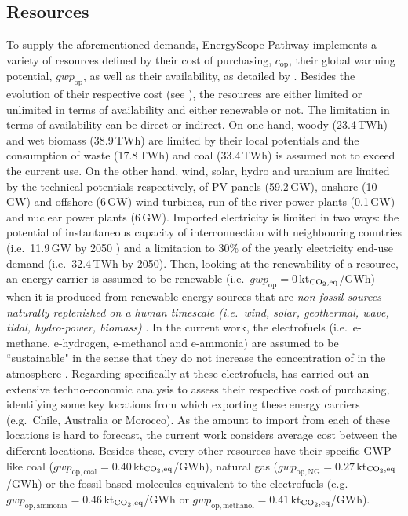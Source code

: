 \documentclass[11pt,twoside,a4paper,english]{article}
\def\eg{e.g.\ }
\def\ie{i.e.\ }
\begin{document}
\subsection{Resources}
\label{subsec:cs:resources}
To supply the aforementioned demands, EnergyScope Pathway implements a variety of resources defined by their cost of purchasing, $\mathit{c}_{\mathrm{op}}$, their global warming potential, $\mathit{gwp}_{\mathrm{op}}$, as well as their 
availability, as detailed by \citet{limpens2023pathway}. Besides the evolution of their respective cost (see ), the resources are either limited or unlimited in terms of availability and either renewable or not. The limitation in terms of availability can be direct or indirect. On one hand, woody (23.4\,TWh) and wet biomass (38.9\,TWh) are limited by their local potentials and the consumption of waste (17.8\,TWh) and coal (33.4\,TWh) is assumed not to exceed the current use. On the other hand, wind, solar, hydro and uranium are limited by the technical potentials respectively, of \gls{PV} panels (59.2\,GW), onshore (10\,GW) and offshore (6\,GW) wind turbines, run-of-the-river power plants (0.1\,GW) and nuclear power plants (6\,GW). Imported electricity is limited in two ways: the potential of instantaneous capacity of interconnection with neighbouring countries (\ie 11.9\,GW by 2050 \cite{ELIA_2050}) and a limitation to 30\% of the yearly electricity end-use demand (\ie 32.4\,TWh by 2050). Then, looking at the renewability of a resource, an energy carrier is assumed to be renewable (\ie $\mathit{gwp}_{\mathrm{op}}=0$\,kt$_{\ce{CO2},\text{eq}}$/GWh) when it is produced from renewable energy sources \cite{eu2003directive} that are \textit{non-fossil sources naturally replenished on a human timescale (\ie wind, solar, geothermal, wave, tidal, hydro-power, biomass)} \cite{ellabban2014}. In the current work, the electrofuels (\ie e-methane, e-hydrogen, e-methanol and e-ammonia) are assumed to be ``sustainable" in the sense that they do not increase the concentration of  in the atmosphere \cite{rixhon2021terminology}. Regarding specifically at these electrofuels, \citet{h2coalition} has carried out an extensive techno-economic analysis to assess their respective cost of purchasing, identifying some key locations from which exporting these energy carriers (\eg Chile, Australia or Morocco). As the amount to import from each of these locations is hard to forecast, the current work considers average cost between the different locations. Besides these, every other resources have their specific \gls{GWP} like coal ($\mathit{gwp}_{\mathrm{op,coal}}=0.40$\,kt$_{\ce{CO2},\text{eq}}$/GWh), natural gas ($\mathit{gwp}_{\mathrm{op,NG}}=0.27$\,kt$_{\ce{CO2},\text{eq}}$/GWh) or the fossil-based molecules equivalent to the electrofuels (\eg $\mathit{gwp}_{\mathrm{op,ammonia}}=0.46$\,kt$_{\ce{CO2},\text{eq}}$/GWh or $\mathit{gwp}_{\mathrm{op,methanol}}=0.41$\,kt$_{\ce{CO2},\text{eq}}$/GWh).
\end{document}
